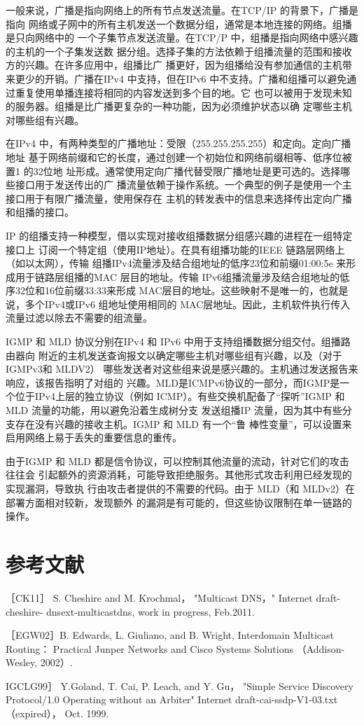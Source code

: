 一般来说，广播是指向网络上的所有节点发送流量。在TCP/IP 的背景下，广播是指向
网络或子网中的所有主机发送一个数据分组，通常是本地连接的网络。组播是只向网络中的
一个子集节点发送流量。在TCP/P 中，组播是指向网络中感兴趣的主机的一个子集发送数
据分组。选择子集的方法依赖于组播流量的范围和接收方的兴趣。在许多应用中，组播比广
播更好，因为组播给没有参加通信的主机带来更少的开销。广播在IPv4 中支持，但在IPv6
中不支持。广播和组播可以避免通过重复使用单播连接将相同的内容发送到多个目的地。它
也可以被用于发现未知的服务器。组播是比广播更复杂的一种功能，因为必须维护状态以确
定哪些主机对哪些组有兴趣。

在IPv4 中，有两种类型的广播地址：受限（255.255.255.255）和定向。定向广播地址
基于网络前缀和它的长度，通过创建一个初始位和网络前缀相等、低序位被置1 的32位地
址形成。通常使用定向广播代替受限广播地址是更可选的。选择哪些接口用于发送传出的广
播流量依赖于操作系统。一个典型的例子是使用一个主接口用于有限广播流量，使用保存在
主机的转发表中的信息来选择传出定向广播和组播的接口。

IP 的组播支持一种模型，借以实现对接收组播数据分组感兴趣的进程在一组特定接口上
订阅一个特定组（使用IP地址）。在具有组播功能的IEEE 链路层网络上（如以太网），传输
组播IPv4流量涉及结合组地址的低序23位和前缀01:00:5e 来形成用于链路层组播的MAC
层目的地址。传输 IPv6组播流量涉及结合组地址的低序32位和16位前缀33:33来形成
MAC层目的地址。这些映射不是唯一的，也就是说，多个IPv4或IPv6 组地址使用相同的
MAC层地址。因此，主机软件执行传入流量过滤以除去不需要的组流量。

IGMP 和 MLD 协议分别在IPv4 和 IPv6 中用于支持组播数据分组交付。组播路由器向
附近的主机发送查询报文以确定哪些主机对哪些组有兴趣，以及（对于 IGMPv3和 MLDV2）
哪些发送者对这些组来说是感兴趣的。主机通过发送报告来响应，该报告指明了对组的
兴趣。MLD是ICMPv6协议的一部分，而IGMP是一个位于IPv4上层的独立协议（例如
ICMP）。有些交换机配备了“探听”IGMP 和 MLD 流量的功能，用以避免沿着生成树分支
发送组播IP 流量，因为其中有些分支存在没有兴趣的接收主机。IGMP 和 MLD 有一个“鲁
棒性变量”，可以设置来启用网络上易于丢失的重要信息的重传。

由于IGMP 和 MLD 都是信令协议，可以控制其他流量的流动，针对它们的攻击往往会
引起额外的资源消耗，可能导致拒绝服务。其他形式攻击利用已经发现的实现漏洞，导致执
行由攻击者提供的不需要的代码。由于 MLD（和 MLDv2）在部署方面相对较新，发现额外
的漏洞是有可能的，但这些协议限制在单一链路的操作。

\section{参考文献}
［CK11］ S. Cheshire and M. Krochmal， "Multicast DNS，" Internet draft-cheshire-
dnsext-multicastdns, work in progress, Feb.2011.

［EGW02］B. Edwards, L. Giuliano, and B. Wright, Interdomain Multicast Routing：
Practical Junper Networks and Cisco Systems Solutions （Addison-Wesley, 2002）.

IGCLG99］ Y.Goland, T. Cai, P. Leach, and Y. Gu， "Simple Service Discovery
Protocol/1.0 Operating without an Arbiter" Internet draft-cai-ssdp-V1-03.txt
（expired）， Oct. 1999.